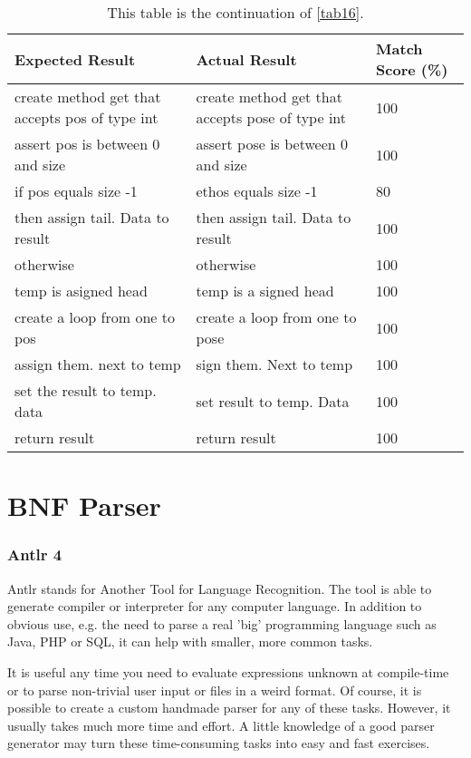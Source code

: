 \begin{table}[H]
	\centering
	\begin{tabular}{|p{6cm}|p{6cm}|p{2cm}|}
		\hline
		{\bf Expected Result} & {\bf Actual Result} & {\bf Match Score (\%)} \\ \hline
		create method get that accepts pos of type int & create method get that accepts pose of type int & 100 \\ \hline
		assert pos is between 0 and size & assert pose is between 0 and size & 100 \\ \hline
		if pos equals size -1 & ethos equals size -1 & 80 \\ \hline
		then assign tail. Data to result & then assign tail. Data to result & 100 \\ \hline
		otherwise & otherwise & 100 \\ \hline
		temp is asigned head & temp is a signed head & 100 \\ \hline
		create a loop from one to pos & create a loop from one to pose & 100 \\ \hline
		assign them. next to temp & sign them. Next to temp & 100 \\ \hline
		set the result to temp. data & set result to temp. Data & 100 \\ \hline
		return result & return result & 100 \\ \hline
	\end{tabular}
	\caption{This table is the continuation of \autoref{tab16}.}
	\label{tab17}
\end{table} 
\section{BNF Parser} \label{section:BNF Parser}
\subsubsection{Antlr 4}
Antlr stands for Another Tool for Language Recognition. The tool is able to generate compiler or interpreter for any computer language. In addition to obvious use, e.g. the need to parse a real 'big' programming language such as Java, PHP or SQL, it can help with smaller, more common tasks.

It is useful any time you need to evaluate expressions unknown at compile-time or to parse non-trivial user input or files in a weird format. Of course, it is possible to create a custom handmade parser for any of these tasks. However, it usually takes much more time and effort. A little knowledge of a good parser generator may turn these time-consuming tasks into easy and fast exercises.

